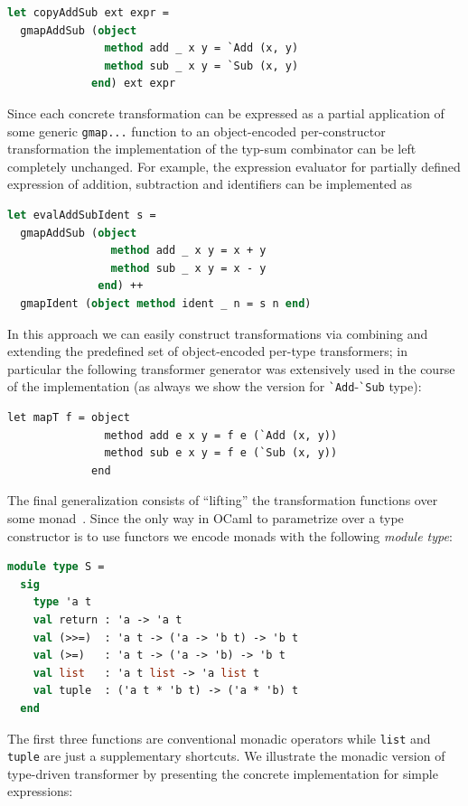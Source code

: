 \begin{lstlisting}[language=ocaml]
let copyAddSub ext expr =
  gmapAddSub (object
               method add _ x y = `Add (x, y)
               method sub _ x y = `Sub (x, y)
             end) ext expr
\end{lstlisting}

Since each concrete transformation can be expressed as a partial application of
some generic \lstinline{gmap...} function to an object-encoded per-constructor
transformation the implementation of the typ-sum combinator can be left completely 
unchanged. For example, the expression evaluator for partially defined expression
of addition, subtraction and identifiers can be implemented as

\begin{lstlisting}[language=ocaml]
let evalAddSubIdent s = 
  gmapAddSub (object
                method add _ x y = x + y
                method sub _ x y = x - y
              end) ++
  gmapIdent (object method ident _ n = s n end)
\end{lstlisting}

In this approach we can easily construct transformations via combining and
extending the predefined set of object-encoded per-type transformers; in 
particular the following transformer generator was extensively used in the course
of the implementation (as always we show the version for \lstinline{`Add}-\lstinline{`Sub}
type):

\begin{lstlisting}
let mapT f = object
               method add e x y = f e (`Add (x, y))
               method sub e x y = f e (`Sub (x, y))
             end
\end{lstlisting}

The final generalization consists of ``lifting'' the transformation functions
over some monad~\cite{Monads}. Since the only way in OCaml to parametrize over a
type constructor is to use functors we encode monads with the following \emph{module type}:

\begin{lstlisting}[language=ocaml]
module type S = 
  sig
    type 'a t
    val return : 'a -> 'a t
    val (>>=)  : 'a t -> ('a -> 'b t) -> 'b t
    val (>=)   : 'a t -> ('a -> 'b) -> 'b t
    val list   : 'a t list -> 'a list t
    val tuple  : ('a t * 'b t) -> ('a * 'b) t 
  end
\end{lstlisting}

The first three functions are conventional monadic operators while \lstinline{list} and
\lstinline{tuple} are just a supplementary shortcuts. We illustrate the monadic version of 
type-driven transformer by presenting the concrete implementation for simple expressions:

